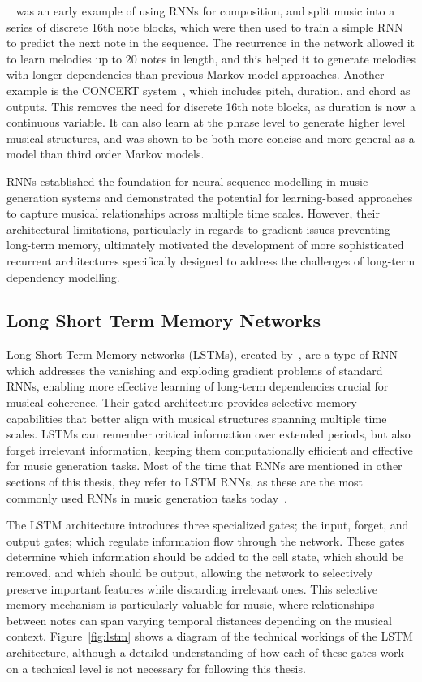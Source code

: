 ~\cite{Todd1989RNNComposition} was an early example of using RNNs for composition, and split music into a series of discrete 16th note blocks, which were then used to train a simple RNN to predict the next note in the sequence. The recurrence in the network allowed it to learn melodies up to 20 notes in length, and this helped it to generate melodies with longer dependencies than previous Markov model approaches. Another example is the CONCERT system~\citep{Mozer1994CONCERT}, which includes pitch, duration, and chord as outputs. This removes the need for discrete 16th note blocks, as duration is now a continuous variable. It can also learn at the phrase level to generate higher level musical structures, and was shown to be both more concise and more general as a model than third order Markov models.

RNNs established the foundation for neural sequence modelling in music generation systems and demonstrated the potential for learning-based approaches to capture musical relationships across multiple time scales. However, their architectural limitations, particularly in regards to gradient issues preventing long-term memory, ultimately motivated the development of more sophisticated recurrent architectures specifically designed to address the challenges of long-term dependency modelling.

\subsection{Long Short Term Memory Networks}
Long Short-Term Memory networks (LSTMs), created by~\cite{Hochreiter1997LSTM}, are a type of RNN which addresses the vanishing and exploding gradient problems of standard RNNs, enabling more effective learning of long-term dependencies crucial for musical coherence. Their gated architecture provides selective memory capabilities that better align with musical structures spanning multiple time scales. LSTMs can remember critical information over extended periods, but also forget irrelevant information, keeping them computationally efficient and effective for music generation tasks. Most of the time that RNNs are mentioned in other sections of this thesis, they refer to LSTM RNNs, as these are the most commonly used RNNs in music generation tasks today~\citep{Ji2024DeepLearningInMusicSurvey}.

The LSTM architecture introduces three specialized gates; the input, forget, and output gates; which regulate information flow through the network. These gates determine which information should be added to the cell state, which should be removed, and which should be output, allowing the network to selectively preserve important features while discarding irrelevant ones. This selective memory mechanism is particularly valuable for music, where relationships between notes can span varying temporal distances depending on the musical context. Figure~\ref{fig:lstm} shows a diagram of the technical workings of the LSTM architecture, although a detailed understanding of how each of these gates work on a technical level is not necessary for following this thesis.

